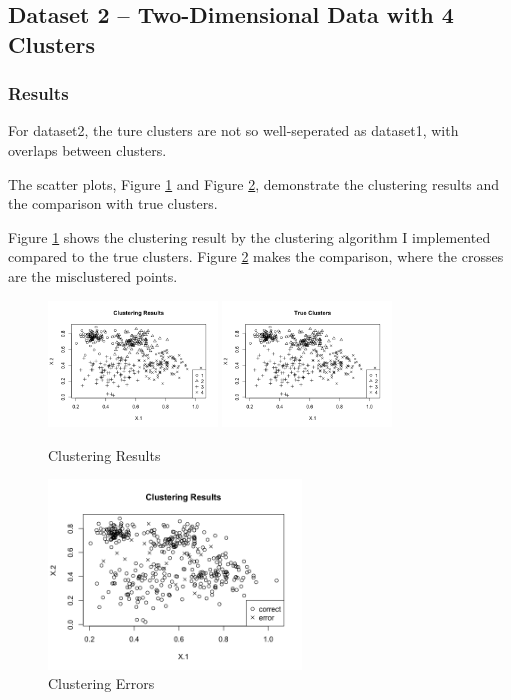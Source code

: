 \documentclass{article}
\begin{document}
	\subsection{Dataset 2 -- Two-Dimensional Data with 4 Clusters}
		\subsubsection{Results}
		For dataset2, the ture clusters are not so well-seperated as dataset1, with overlaps between clusters. 

		The scatter plots, Figure \ref{fig:hard-cluster} and Figure \ref{fig:hard-error}, demonstrate the clustering results and the comparison with true clusters.

		Figure \ref{fig:hard-cluster} shows the clustering result by the clustering algorithm I implemented compared to the true clusters.  Figure \ref{fig:hard-error} makes the comparison, where the crosses are the misclustered points.

		\begin{figure}[H]
		\centering
		\includegraphics[width = 0.4\textwidth]{hard-cluster.png}
		\includegraphics[width = 0.4\textwidth]{hard-true-cluster.png}
		\caption{Clustering Results}
		\label{fig:hard-cluster}
		\end{figure}
		\begin{figure}[H]
		\centering
		\includegraphics[width = 0.6\textwidth]{hard-error.png}
		\caption{Clustering Errors}
		\label{fig:hard-error}
		\end{figure}
\end{document}
